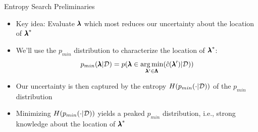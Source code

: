 \begin{frame}[c]{Entropy Search  Preliminaries}
\begin{itemize}
    \item Key idea: Evaluate $\pmb{\lambda}$ which most \alert{reduces our uncertainty about the location of ${\pmb{\lambda}}^*$}
\bigskip    
\pause    
    \item We'll use the $p_{min}$ distribution to characterize the location of ${\pmb{\lambda}}^*$: \alert{\[p_{min}(\pmb{\lambda}|\mathcal{D}) = p(\pmb{\lambda} \in \operatorname*{arg\,min}_{\pmb{\lambda}' \in \pmb{\Lambda}} (\hat{c}(\pmb{\lambda}') | \mathcal{D}))\]}
\medskip
\pause
    \item Our uncertainty is then captured by the \alert{entropy $H( p_{min}(\cdot |\mathcal{D}))$ of the $p_{min}$ distribution}
\pause
\bigskip    
    \item Minimizing $H( p_{min}(\cdot |\mathcal{D}))$ yields a peaked $p_{min}$ distribution, i.e., strong knowledge about the location of ${\pmb{\lambda}}^*$
    
\end{itemize}

\end{frame}
